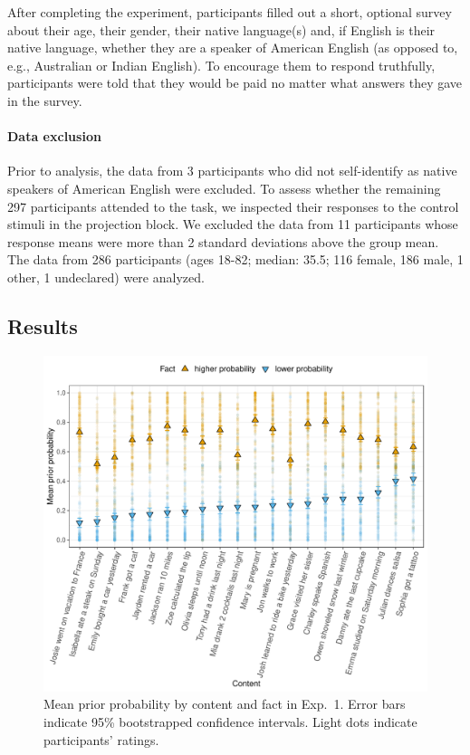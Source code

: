 \documentclass[11pt,fleqn]{article}
\newcommand{\6}{\mbox{$[\hspace*{-.6mm}[$}}
\newcommand{\9}{\mbox{$]\hspace*{-.6mm}]$}}
\begin{document}
After completing the experiment, participants filled out a short, optional survey about their age, their gender, their native language(s) and, if English is their native language, whether they are a speaker of American English (as opposed to, e.g., Australian or Indian English). To encourage them to respond truthfully, participants were told that they would be paid no matter what answers they gave in the survey.

\paragraph{Data exclusion} Prior to analysis, the data from 3 participants who did not self-identify as native speakers of American English were excluded. To assess whether the remaining 297 participants attended to the task, we inspected their responses to the control stimuli in the projection block. We excluded the data from 11 participants whose response means were more than 2 standard deviations above the group mean. The data from 286 participants (ages 18-82; median: 35.5; 116 female, 186 male, 1 other, 1 undeclared) were analyzed.

\subsection{Results}

\begin{figure}[h!]
\centering
\includegraphics[width=.75\paperwidth]{../../results/exp4/graphs/prior-ratings}

\caption{Mean prior probability by content and fact in Exp.~1. Error bars indicate 95\% bootstrapped confidence intervals. Light dots indicate participants' ratings.} 
\label{f-projection}
\end{figure}
\end{document}
